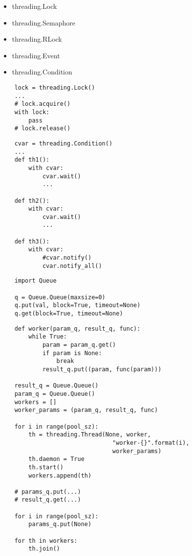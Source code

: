 \documentclass{article}
\begin{document}
\begin{itemize}
	\item threading.Lock
	\item threading.Semaphore
	\item threading.RLock
	\item threading.Event
	\item threading.Condition
\end{itemize}

{
\LARGE \vspace{15pt}
\begin{lstlisting}
	lock = threading.Lock()
	...
	# lock.acquire()
	with lock: 
		pass
	# lock.release()
\end{lstlisting}
}

\newpage


{
\LARGE \vspace{15pt}
\begin{lstlisting}
	cvar = threading.Condition()
	...
	def th1():
		with cvar: 
			cvar.wait()
			...

	def th2():
		with cvar: 
			cvar.wait()
			...

	def th3():
		with cvar:
			#cvar.notify()
			cvar.notify_all()
\end{lstlisting}
}
\newpage

{
\LARGE \vspace{15pt}
\begin{lstlisting}
	import Queue

	q = Queue.Queue(maxsize=0)
	q.put(val, block=True, timeout=None)
	q.get(block=True, timeout=None)
\end{lstlisting}
}
\newpage

{
\LARGE \vspace{15pt}
\begin{lstlisting}
	def worker(param_q, result_q, func):
		while True:
			param = param_q.get()
			if param is None:
				break
			result_q.put((param, func(param)))

	result_q = Queue.Queue()
	param_q = Queue.Queue()
	workers = []
	worker_params = (param_q, result_q, func)

	for i in range(pool_sz):
		th = threading.Thread(None, worker, 
								"worker-{}".format(i), 
								worker_params)
		th.daemon = True
		th.start()
		workers.append(th)

	# params_q.put(...)
	# result_q.get(...)

	for i in range(pool_sz):
		params_q.put(None)

	for th in workers:
		th.join()
\end{lstlisting}
}
\newpage
\end{document}
